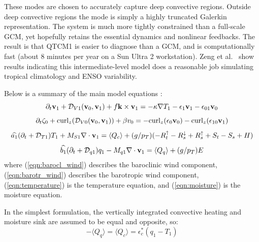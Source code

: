 These modes are chosen to accurately capture deep convective regions.
Outside deep convective regions the mode
is simply a highly truncated
Galerkin representation.  The system is much more tightly constrained than
a full-scale GCM, yet hopefully retains the essential dynamics and nonlinear
feedbacks.  The result is that QTCM1 is easier to diagnose than a GCM,
and is computationally fast (about 8 minutes per year on a Sun Ultra 2
workstation).  Zeng et al.\ \cite{Zeng/etal:2000} show results indicating
this intermediate-level model does a reasonable job simulating
tropical climatology and ENSO variability.  


Below is a summary of the main model equations \cite{Neelin/Zeng:2000}:
\begin{equation}
   \partial_t \mathbf{v}_1 
      + \mathcal{D}_{V1} (\mathbf{v}_0 , \mathbf{v}_1)
      + f \mathbf{k} \times \mathbf{v}_1
      =
   - \kappa \nabla T_1 
      - \epsilon_1 \mathbf{v}_1 
      - \epsilon_{01} \mathbf{v}_0
   \label{eqn:barocl_wind}
\end{equation}
\begin{equation}
   \partial_t \zeta_0 
      + \mathrm{curl}_z (\mathcal{D}_{V0} (\mathbf{v}_0 , \mathbf{v}_1))
      + \beta v_0
      =
   - \mathrm{curl}_z (\epsilon_0 \mathbf{v}_0)
      - \mathrm{curl}_z (\epsilon_{10} \mathbf{v}_1)
   \label{eqn:barotr_wind}
\end{equation}
\begin{equation}
   \widehat{a_1} (\partial_t + \mathcal{D}_{T1}) T_1 
      + M_{S1} \nabla \cdot {\bf v}_1 
      =
   \langle Q_c \rangle
      + (g/p_T) (-R^\uparrow_t -R^\downarrow_s + R^\uparrow_s + S_t - S_s + H)
   \label{eqn:temperature}
\end{equation}
\begin{equation}
   \widehat{b_1} (\partial_t + \mathcal{D}_{q1}) q_1 
      - M_{q1} \nabla \cdot {\bf v}_1 
      =
   \langle Q_q \rangle
      + (g/p_T) E
   \label{eqn:moisture}
\end{equation}
where (\ref{eqn:barocl_wind}) describes the baroclinic wind component,
      (\ref{eqn:barotr_wind}) describes the barotropic wind component,
      (\ref{eqn:temperature}) is the temperature equation, and
      (\ref{eqn:moisture}) is the moisture equation.

In the simplest formulation, the vertically integrated
convective heating and moisture sink
are assumed to be equal and opposite, so:
\begin{equation}
  -\langle Q_q \rangle = \langle Q_c \rangle 
                              = \epsilon^\ast_c (q_1 - T_1)
\end{equation}

